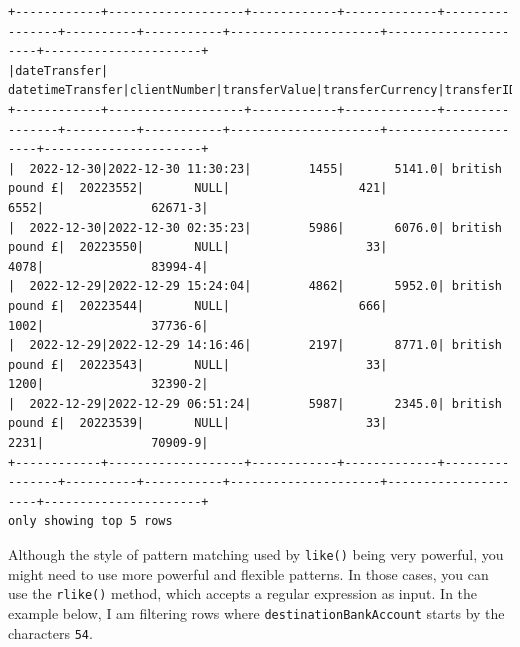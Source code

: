 \documentclass[
  11pt,
  letterpaper,
  DIV=11,
  numbers=noendperiod]{scrreprt}
\newenvironment{Shaded}{\begin{snugshade}}{\end{snugshade}}
\newcommand{\DecValTok}[1]{\textcolor[rgb]{0.68,0.00,0.00}{#1}}
\newcommand{\NormalTok}[1]{\textcolor[rgb]{0.00,0.23,0.31}{#1}}
\newcommand{\OperatorTok}[1]{\textcolor[rgb]{0.37,0.37,0.37}{#1}}
\newcommand{\SpecialCharTok}[1]{\textcolor[rgb]{0.37,0.37,0.37}{#1}}
\newcommand{\StringTok}[1]{\textcolor[rgb]{0.13,0.47,0.30}{#1}}
\begin{document}
\begin{verbatim}
+------------+-------------------+------------+-------------+----------------+----------+-----------+---------------------+---------------------+----------------------+
|dateTransfer|   datetimeTransfer|clientNumber|transferValue|transferCurrency|transferID|transferLog|destinationBankNumber|destinationBankBranch|destinationBankAccount|
+------------+-------------------+------------+-------------+----------------+----------+-----------+---------------------+---------------------+----------------------+
|  2022-12-30|2022-12-30 11:30:23|        1455|       5141.0| british pound £|  20223552|       NULL|                  421|                 6552|               62671-3|
|  2022-12-30|2022-12-30 02:35:23|        5986|       6076.0| british pound £|  20223550|       NULL|                   33|                 4078|               83994-4|
|  2022-12-29|2022-12-29 15:24:04|        4862|       5952.0| british pound £|  20223544|       NULL|                  666|                 1002|               37736-6|
|  2022-12-29|2022-12-29 14:16:46|        2197|       8771.0| british pound £|  20223543|       NULL|                   33|                 1200|               32390-2|
|  2022-12-29|2022-12-29 06:51:24|        5987|       2345.0| british pound £|  20223539|       NULL|                   33|                 2231|               70909-9|
+------------+-------------------+------------+-------------+----------------+----------+-----------+---------------------+---------------------+----------------------+
only showing top 5 rows
\end{verbatim}

Although the style of pattern matching used by \texttt{like()} being
very powerful, you might need to use more powerful and flexible
patterns. In those cases, you can use the \texttt{rlike()} method, which
accepts a regular expression as input. In the example below, I am
filtering rows where \texttt{destinationBankAccount} starts by the
characters \texttt{54}.

\begin{Shaded}
\end{Shaded}
\end{document}
